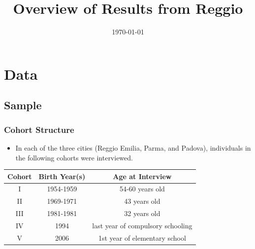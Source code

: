 \documentclass{beamer}
\title{Overview of Results from Reggio}
\date{\today}
\begin{document}
\begin{frame}
	\titlepage
\end{frame}


\section{Data}
\subsection{Sample}


\begin{frame}
	\frametitle{Cohort Structure}
	\begin{itemize}
	\item In each of the three cities (Reggio Emilia, Parma, and Padova), individuals in the following cohorts were interviewed.
	\end{itemize}
	\centering
	\vspace{1cm}
	\begin{tabular}{ccc}
	\toprule
	Cohort & Birth Year(s) & Age at Interview \\
	\midrule
	I & 1954-1959 & 54-60 years old  \\
	II & 1969-1971 & 43 years old \\
	III & 1981-1981 & 32 years old \\
	IV & 1994 & last year of compulsory schooling  \\
	V & 2006 & 1st year of elementary school  \\
	\bottomrule
	\end{tabular}
\end{frame}

\end{document}
